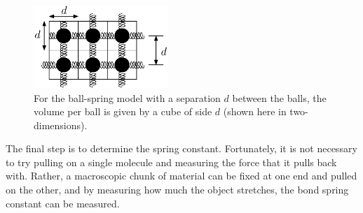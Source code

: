 %

\begin{figure}
\begin{center}
\includegraphics[width=2in]{thermal_energy_and_solids/ball-spring-volume.eps}
\caption{For the ball-spring model with a separation $d$ between the 
balls, the volume per ball is given by a cube of side $d$ (shown here
in two-dimensions).}
\label{fig:ball-spring-volume}
\end{center}
\end{figure}


The final step is to determine the spring constant.  Fortunately, it
is not necessary to try pulling on a single molecule and measuring the
force that it pulls back with.  Rather, a macroscopic chunk of
material can be fixed at one end and pulled on the other, and by
measuring how much the object stretches, the bond spring constant can
be measured.

